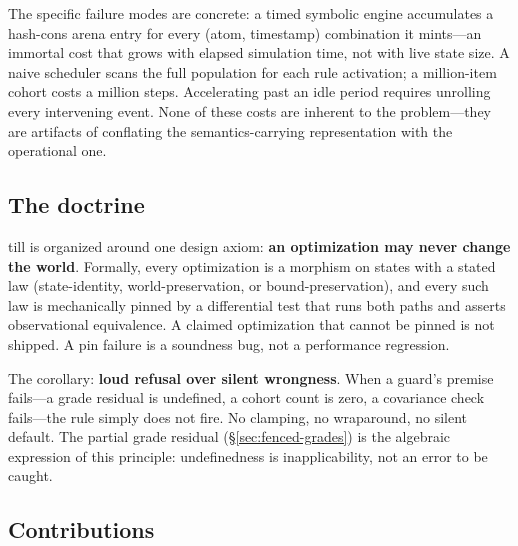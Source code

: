 \documentclass[11pt]{article}
\theoremstyle{remark}
\begin{document}
The specific failure modes are concrete: a timed symbolic engine accumulates a
hash-cons arena entry for every (atom, timestamp) combination it mints---an
immortal cost that grows with elapsed simulation time, not with live state size.
A naive scheduler scans the full population for each rule activation; a
million-item cohort costs a million steps.  Accelerating past an idle period
requires unrolling every intervening event.  None of these costs are inherent to
the problem---they are artifacts of conflating the semantics-carrying
representation with the operational one.

\subsection{The doctrine}

till is organized around one design axiom: \textbf{an optimization may never
change the world}.  Formally, every optimization is a morphism on states with a
stated law (state-identity, world-preservation, or bound-preservation), and every
such law is mechanically pinned by a differential test that runs both paths and
asserts observational equivalence.  A claimed optimization that cannot be pinned
is not shipped.  A pin failure is a soundness bug, not a performance regression.

The corollary: \textbf{loud refusal over silent wrongness}.  When a guard's
premise fails---a grade residual is undefined, a cohort count is zero, a
covariance check fails---the rule simply does not fire.  No clamping, no
wraparound, no silent default.  The partial grade residual (\S\ref{sec:fenced-grades})
is the algebraic expression of this principle: undefinedness is inapplicability,
not an error to be caught.

\subsection{Contributions}
\end{document}
